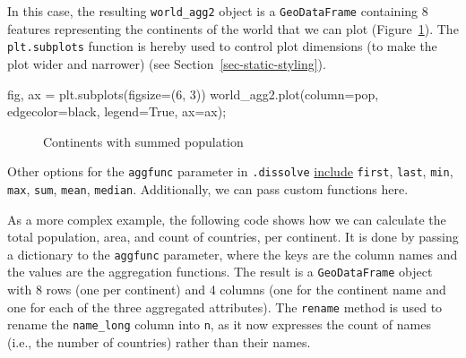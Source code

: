 \documentclass[
  letterpaper,
]{krantz}
\newenvironment{Shaded}{\begin{snugshade}}{\end{snugshade}}
\newcommand{\DecValTok}[1]{\textcolor[rgb]{0.68,0.00,0.00}{#1}}
\newcommand{\NormalTok}[1]{\textcolor[rgb]{0.00,0.23,0.31}{#1}}
\newcommand{\OperatorTok}[1]{\textcolor[rgb]{0.37,0.37,0.37}{#1}}
\newcommand{\StringTok}[1]{\textcolor[rgb]{0.13,0.47,0.30}{#1}}
\newcommand{\VariableTok}[1]{\textcolor[rgb]{0.07,0.07,0.07}{#1}}
\begin{document}
In this case, the resulting \texttt{world\_agg2} object is a
\texttt{GeoDataFrame} containing 8 features representing the continents
of the world that we can plot (Figure~\ref{fig-spatial-aggregation}).
The \texttt{plt.subplots} function is hereby used to control plot
dimensions (to make the plot wider and narrower) (see
Section~\ref{sec-static-styling}).

\begin{Shaded}
\begin{Highlighting}[]
\NormalTok{fig, ax }\OperatorTok{=}\NormalTok{ plt.subplots(figsize}\OperatorTok{=}\NormalTok{(}\DecValTok{6}\NormalTok{, }\DecValTok{3}\NormalTok{))}
\NormalTok{world\_agg2.plot(column}\OperatorTok{=}\StringTok{\textquotesingle{}pop\textquotesingle{}}\NormalTok{, edgecolor}\OperatorTok{=}\StringTok{\textquotesingle{}black\textquotesingle{}}\NormalTok{, legend}\OperatorTok{=}\VariableTok{True}\NormalTok{, ax}\OperatorTok{=}\NormalTok{ax)}\OperatorTok{;}
\end{Highlighting}
\end{Shaded}

\begin{figure}[H]


\caption{\label{fig-spatial-aggregation}Continents with summed
population}

\end{figure}%

Other options for the \texttt{aggfunc} parameter in \texttt{.dissolve}
\href{https://geopandas.org/en/stable/docs/user_guide/aggregation_with_dissolve.html}{include}
\texttt{\textquotesingle{}first\textquotesingle{}},
\texttt{\textquotesingle{}last\textquotesingle{}},
\texttt{\textquotesingle{}min\textquotesingle{}},
\texttt{\textquotesingle{}max\textquotesingle{}},
\texttt{\textquotesingle{}sum\textquotesingle{}},
\texttt{\textquotesingle{}mean\textquotesingle{}},
\texttt{\textquotesingle{}median\textquotesingle{}}. Additionally, we
can pass custom functions here.

As a more complex example, the following code shows how we can calculate
the total population, area, and count of countries, per continent. It is
done by passing a dictionary to the \texttt{aggfunc} parameter, where
the keys are the column names and the values are the aggregation
functions. The result is a \texttt{GeoDataFrame} object with 8 rows (one
per continent) and 4 columns (one for the continent name and one for
each of the three aggregated attributes). The \texttt{rename} method is
used to rename the
\texttt{\textquotesingle{}name\_long\textquotesingle{}} column into
\texttt{\textquotesingle{}n\textquotesingle{}}, as it now expresses the
count of names (i.e., the number of countries) rather than their names.
\end{document}

